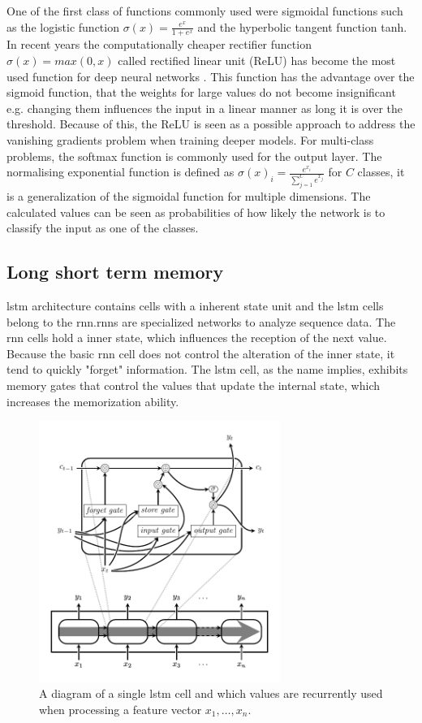 One of the first class of functions commonly used were sigmoidal functions such as the logistic function $\sigma(x)=\frac{e^x}{1+e^x}$ and the hyperbolic tangent function tanh. In recent years the computationally cheaper rectifier function $\sigma(x)=max(0,x)$ called rectified linear unit (ReLU) has become the most used function for deep neural networks \cite{Lecun2015}.
This function has the advantage over the sigmoid function, that the weights for large values do not become insignificant e.g. changing them influences the input in a linear manner as long it is over the threshold.
Because of this, the ReLU is seen as a possible approach to address the vanishing gradients problem when training deeper models.
For multi-class problems, the softmax function is commonly used for the output layer. The normalising exponential function is defined as $\sigma(x)_i = \frac{e^{x_i}}{\sum_{j=1}^C e^{x_j}}$ for $C$ classes, it is a generalization of the sigmoidal function for multiple dimensions. The calculated values can be seen as probabilities of how likely the network is to classify the input as one of the classes.

%
%

\subsection{Long short term memory}
\Gls{lstm} architecture contains cells with a inherent state unit and the \gls{lstm} cells belong to the \gls{rnn}.\Glspl{rnn} are specialized networks to analyze sequence data. The \gls{rnn} cells hold a inner state, which influences the reception of the next value.
Because the basic \gls{rnn} cell does not control the alteration of the inner state, it tend to quickly "forget" information.
The \gls{lstm} cell, as the name implies, exhibits memory gates that control the values that update the internal state, which increases the memorization ability.

\begin{figure}[H]
\centering
  \includegraphics[width=0.7\textwidth]{image/lstm_schema.pdf}
  \caption{A diagram of a single \gls{lstm} cell and which values are recurrently used when processing a feature vector $x_1,\hdots,x_n$.}
  \label{fig:lstm_schema}
\end{figure}

